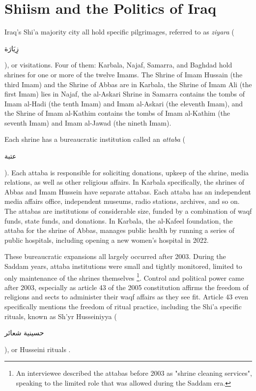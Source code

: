 \section{Shiism and the Politics of Iraq}
Iraq's Shi'a majority city all hold specific pilgrimages, referred to as \emph{ziyara} (\begin{Arabic}زِيَارَة\end{Arabic}), or visitations. Four of them: Karbala, Najaf, Samarra, and Baghdad hold shrines for one or more of the twelve Imams. The Shrine of Imam Hussain (the third Imam) and the Shrine of Abbas are in Karbala, the Shrine of Imam Ali (the first Imam) lies in Najaf, the al-Askari Shrine in Samarra contains the tombs of Imam al-Hadi (the tenth Imam) and Imam al-Askari (the eleventh Imam), and the Shrine of Imam al-Kathim contains the tombs of Imam al-Kathim (the seventh Imam) and Imam al-Jawad (the nineth Imam). 

Each shrine has a bureaucratic institution called an \emph{attaba} (\begin{Arabic}عتبة\end{Arabic}). Each attaba is responsible for soliciting donations, upkeep of the shrine, media relations, as well as other religious affairs. In Karbala specifically, the shrines of Abbas and Imam Hussein have separate attabas. Each attaba has an independent media affairs office, independent museums, radio stations, archives, and so on. The attabas are institutions of considerable size, funded by a combination of waqf funds, state funds, and donations. In Karbala, the al-Kafeel foundation, the attaba for the shrine of Abbas, manages public health by running a series of public hospitals, including opening a new women's hospital in 2022. 

These bureaucratic expansions all largely occurred after 2003. During the Saddam years, attaba institutions were small and tightly monitored, limited to only maintenance of the shrines themselves \footnote{An interviewee described the attabas before 2003 as "shrine cleaning services", speaking to the limited role that was allowed during the Saddam era.}. Control and political power came after 2003, especially as article 43 of the 2005 constitution affirms the freedom of religions and sects to administer their waqf affairs as they see fit. Article 43 even specifically mentions the freedom of ritual practice, including the Shi'a specific rituals, known as Sh'yr Husseiniyya (\begin{Arabic}حسينية شعائر\end{Arabic}), or Husseini rituals \cite{jawad_iraqi_2003}. 


